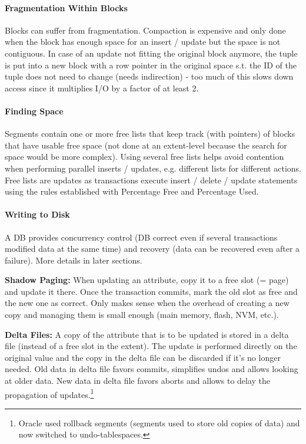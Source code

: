 \paragraph{Fragmentation Within Blocks}
Blocks can suffer from fragmentation. Compaction is expensive and only done when the block has enough space for an insert / update but the space is not contiguous. In case of an update not fitting the original block anymore, the tuple is put into a new block with a row pointer in the original space s.t. the ID of the tuple does not need to change (needs indirection) - too much of this slows down access since it multiplies I/O by a factor of at least 2.

\paragraph{Finding Space}
Segments contain one or more free lists that keep track (with pointers) of blocks that have usable free space (not done at an extent-level because the search for space would be more complex). Using several free lists helps avoid contention when performing parallel inserts / updates, e.g. different lists for different actions. Free lists are updates as transactions execute insert / delete / update statements using the rules established with Percentage Free and Percentage Used.

\paragraph{Writing to Disk}
A DB provides concurrency control (DB correct even if several transactions modified data at the same time) and recovery (data can be recovered even after a failure). More details in later sections.

\textbf{Shadow Paging:} When updating an attribute, copy it to a free slot (= page) and update it there. Once the transaction commits, mark the old slot as free and the new one as correct. Only makes sense when the overhead of creating a new copy and managing them is small enough (main memory, flash, NVM, etc.).

\textbf{Delta Files:} A copy of the attribute that is to be updated is stored in a delta file (instead of a free slot in the extent). The update is performed directly on the original value and the copy in the delta file can be discarded if it's no longer needed. Old data in delta file favors commits, simplifies undos and allows looking at older data. New data in delta file favors aborts and allows to delay the propagation of updates.\footnote{Oracle used rollback segments (segments used to store old copies of data) and now switched to undo-tablespaces.}












